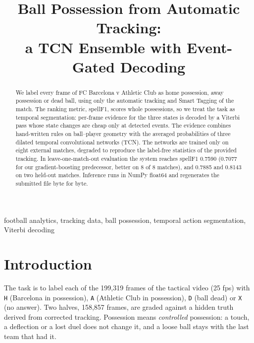 \documentclass[conference]{IEEEtran}
\newcommand{\spf}{spellF1}
\begin{document}
\title{Ball Possession from Automatic Tracking:\\ a TCN Ensemble with Event-Gated Decoding}

\author{
}

\maketitle

\begin{abstract}
We label every frame of FC Barcelona v Athletic Club as home possession, away possession or dead ball, using only
the automatic tracking and Smart Tagging of the match. The ranking metric, \spf{}, scores whole possessions, so we
treat the task as temporal segmentation: per-frame evidence for the three states is decoded by a Viterbi pass whose
state changes are cheap only at detected events. The evidence combines hand-written rules on ball--player geometry
with the averaged probabilities of three dilated temporal convolutional networks (TCN). The networks are trained only
on eight external matches, degraded to reproduce the label-free statistics of the provided tracking. In leave-one-match-out evaluation the system reaches \spf{} 0.7590 (0.7077 for our
gradient-boosting predecessor, better on 8 of 8 matches), and 0.7885 and 0.8143 on two held-out matches. Inference
runs in NumPy float64 and regenerates the submitted file byte for byte.
\end{abstract}

\begin{IEEEkeywords}
football analytics, tracking data, ball possession, temporal action segmentation, Viterbi decoding
\end{IEEEkeywords}

\section{Introduction}

The task is to label each of the 199{,}319 frames of the tactical video (25 fps) with \texttt{H} (Barcelona in
possession), \texttt{A} (Athletic Club in possession), \texttt{D} (ball dead) or \texttt{X} (no answer). Two halves,
158{,}857 frames, are graded against a hidden truth derived from corrected tracking. Possession means
\emph{controlled} possession: a touch, a deflection or a lost duel does not change it, and a loose ball stays with the
last team that had it.
\end{document}
